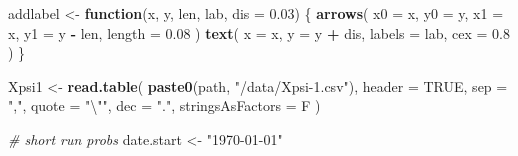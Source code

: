 \documentclass[
]{article}
\newenvironment{Shaded}{\begin{snugshade}}{\end{snugshade}}
\newcommand{\CharTok}[1]{\textcolor[rgb]{0.31,0.60,0.02}{#1}}
\newcommand{\CommentTok}[1]{\textcolor[rgb]{0.56,0.35,0.01}{\textit{#1}}}
\newcommand{\ControlFlowTok}[1]{\textcolor[rgb]{0.13,0.29,0.53}{\textbf{#1}}}
\newcommand{\DataTypeTok}[1]{\textcolor[rgb]{0.13,0.29,0.53}{#1}}
\newcommand{\FloatTok}[1]{\textcolor[rgb]{0.00,0.00,0.81}{#1}}
\newcommand{\KeywordTok}[1]{\textcolor[rgb]{0.13,0.29,0.53}{\textbf{#1}}}
\newcommand{\NormalTok}[1]{#1}
\newcommand{\OperatorTok}[1]{\textcolor[rgb]{0.81,0.36,0.00}{\textbf{#1}}}
\newcommand{\OtherTok}[1]{\textcolor[rgb]{0.56,0.35,0.01}{#1}}
\newcommand{\StringTok}[1]{\textcolor[rgb]{0.31,0.60,0.02}{#1}}
\begin{document}
\begin{Shaded}
\begin{Highlighting}[]
\NormalTok{addlabel <-}\StringTok{ }\ControlFlowTok{function}\NormalTok{(x, y, len, lab, }\DataTypeTok{dis =} \FloatTok{0.03}\NormalTok{) \{}
  \KeywordTok{arrows}\NormalTok{(}
    \DataTypeTok{x0 =}\NormalTok{ x,}
    \DataTypeTok{y0 =}\NormalTok{ y,}
    \DataTypeTok{x1 =}\NormalTok{ x,}
    \DataTypeTok{y1 =}\NormalTok{ y }\OperatorTok{-}\StringTok{ }\NormalTok{len,}
    \DataTypeTok{length =} \FloatTok{0.08}
\NormalTok{  )}
  \KeywordTok{text}\NormalTok{(}
    \DataTypeTok{x =}\NormalTok{ x,}
    \DataTypeTok{y =}\NormalTok{ y }\OperatorTok{+}\StringTok{ }\NormalTok{dis,}
    \DataTypeTok{labels =}\NormalTok{ lab,}
    \DataTypeTok{cex =} \FloatTok{0.8}
\NormalTok{  )}
\NormalTok{\}}


\NormalTok{Xpsi1 <-}\StringTok{ }\KeywordTok{read.table}\NormalTok{(}
  \KeywordTok{paste0}\NormalTok{(path, }\StringTok{"/data/Xpsi-1.csv"}\NormalTok{),}
  \DataTypeTok{header =} \OtherTok{TRUE}\NormalTok{,}
  \DataTypeTok{sep =} \StringTok{","}\NormalTok{,}
  \DataTypeTok{quote =} \StringTok{"}\CharTok{\textbackslash{}"}\StringTok{"}\NormalTok{,}
  \DataTypeTok{dec =} \StringTok{"."}\NormalTok{,}
  \DataTypeTok{stringsAsFactors =}\NormalTok{ F}
\NormalTok{)}

\CommentTok{# short run probs}
\NormalTok{date.start <-}\StringTok{ "1970-01-01"}


\end{Highlighting}
\end{Shaded}
\end{document}
